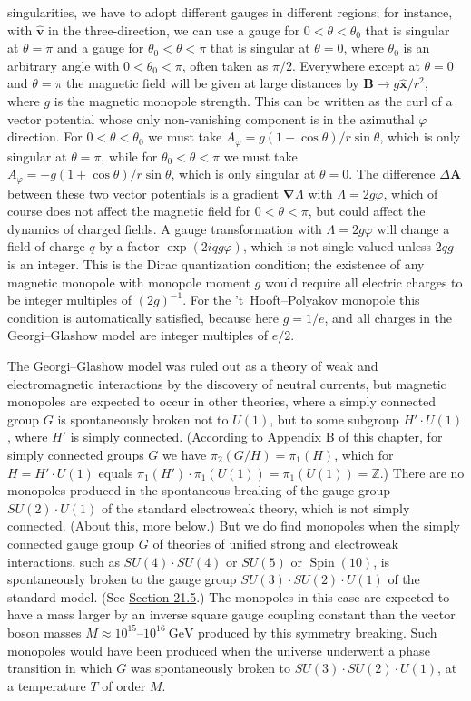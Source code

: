 singularities, we have to adopt different gauges in different regions; for
instance, with $\hat{\mathbf v}$ in the three-direction, we can use a gauge
for $0<\theta<\theta_0$ that is singular at $\theta=\pi$ and a gauge for
$\theta_0<\theta<\pi$ that is singular at $\theta=0$, where $\theta_0$ is
an arbitrary angle with $0<\theta_0<\pi$, often taken as $\pi/2$.
Everywhere except at $\theta=0$ and $\theta=\pi$ the magnetic field will
be given at large distances by
$\mathbf B\to g\hat{\mathbf x}/r^2$, where $g$ is the magnetic monopole
strength. This can be written as the curl of a vector potential whose only
non-vanishing component is in the azimuthal $\varphi$ direction. For
$0<\theta<\theta_0$ we must take
$A_\varphi=g(1-\cos\theta)/r\sin\theta$, which is only singular at
$\theta=\pi$, while for $\theta_0<\theta<\pi$ we must take
$A_\varphi=-g(1+\cos\theta)/r\sin\theta$, which is only singular at
$\theta=0$. The difference $\Delta\mathbf A$ between these two vector
potentials is a gradient $\boldsymbol\nabla\Lambda$ with
$\Lambda=2g\varphi$, which of course does not affect the magnetic field
for $0<\theta<\pi$, but could affect the dynamics of charged fields. A
gauge transformation with $\Lambda=2g\varphi$ will change a field of
charge $q$ by a factor $\exp(2iqg\varphi)$, which is not single-valued
unless $2qg$ is an integer. This is the Dirac quantization condition; the
existence of any magnetic monopole with monopole moment $g$ would require
all electric charges to be integer multiples of $(2g)^{-1}$. For the
't~Hooft--Polyakov monopole this condition is automatically satisfied,
because here $g=1/e$, and all charges in the Georgi--Glashow model are
integer multiples of $e/2$.

The Georgi--Glashow model was ruled out as a theory of weak and
electromagnetic interactions by the discovery of neutral currents, but
magnetic monopoles are expected to occur in other theories, where a simply
connected group $G$ is spontaneously broken not to $U(1)$, but to some
subgroup $H'\cdot U(1)$, where $H'$ is simply connected. (According to
\hyperref[app:23.B]{Appendix B of this chapter}, for simply connected
groups $G$ we have $\pi_2(G/H)=\pi_1(H)$, which for
$H=H'\cdot U(1)$ equals
$\pi_1(H')\cdot\pi_1(U(1))=\pi_1(U(1))=\mathbb Z$.) There are no
monopoles produced in the spontaneous breaking of the gauge group
$SU(2)\cdot U(1)$ of the standard electroweak theory, which is not simply
connected. (About this, more below.) But we do find monopoles when the
simply connected gauge group $G$ of theories of unified strong and
electroweak interactions, such as $SU(4)\cdot SU(4)$ or $SU(5)$ or
$\operatorname{Spin}(10)$, is spontaneously broken to the gauge group
$SU(3)\cdot SU(2)\cdot U(1)$ of the standard model. (See
\hyperref[sec:21.5]{Section 21.5}.) The monopoles in this case are expected
to have a mass larger by an inverse square gauge coupling constant than
the vector boson masses $M\approx10^{15}$--$10^{16}\ \mathrm{GeV}$
produced by this symmetry breaking. Such monopoles would have been
produced when the universe underwent a phase transition in which $G$ was
spontaneously broken to $SU(3)\cdot SU(2)\cdot U(1)$, at a temperature
$T$ of order $M$.

